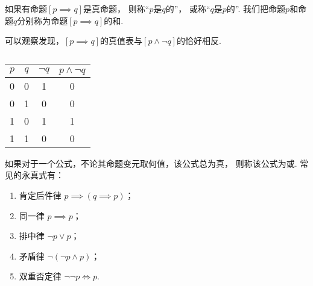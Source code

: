 如果有命题\([p \implies q]\)是真命题，
则称“\(p\)是\(q\)的”，
或称“\(q\)是\(p\)的”.
我们把命题\(p\)和命题\(q\)分别称为命题\([p \implies q]\)的和.

可以观察发现，\([p \implies q]\)的真值表与\([p \land \neg q]\)的恰好相反.
\begin{table}[hb]
	\centering
	\begin{tabular}{|*4{c|}}
		\hline
		\(p\) & \(q\) & \(\neg q\) & \(p \land \neg q\) \\ \hline
		0 & 0 & 1 & 0 \\ \hline
		0 & 1 & 0 & 0 \\ \hline
		1 & 0 & 1 & 1 \\ \hline
		1 & 1 & 0 & 0 \\ \hline
	\end{tabular}
	\caption{}
\end{table}



如果对于一个公式，不论其命题变元取何值，该公式总为真，
则称该公式为或.
常见的永真式有：
\begin{enumerate}
	\item 肯定后件律 \(p \implies (q \implies p)\)；
	\item 同一律 \(p \implies p\)；
	\item 排中律 \(\neg p \lor p\)；
	\item 矛盾律 \(\neg(\neg p \land p)\)；
	\item 双重否定律 \(\neg\neg p \iff p\).
\end{enumerate}


